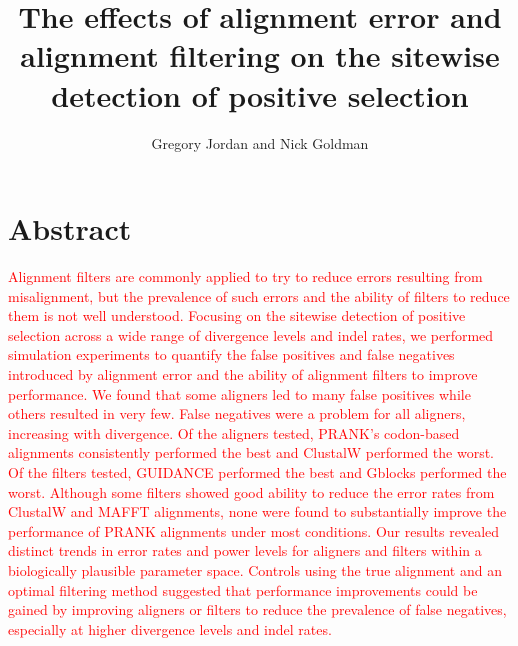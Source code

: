 \documentclass{article}
\begin{document}
\renewcommand\refname{Literature Cited}

\newcommand{\mtwo}{PAML M2a\xspace}
\newcommand{\meight}{PAML M8\xspace}
\newcommand{\pranka}{PRANK$_{\textrm{AA}}$\xspace}
\newcommand{\prankc}{PRANK$_{\textrm{C}}$\xspace}
\newcommand{\omg}{\bm{\omega}\xspace}
\newcommand{\tpr}{TPR$_{1\%}$\xspace}
\newcommand{\sw}{sitewise\xspace}
\newcommand{\Sw}{Sitewise\xspace}
\newcommand{\Dr}{{\emph{Drosophila}}\xspace}

\title{The effects of alignment error and alignment filtering on the \sw detection of positive selection}
\author{{Gregory Jordan and Nick Goldman}}
\maketitle

\section*{Abstract}
\textcolor{red}{
Alignment filters are commonly applied to try to reduce errors
resulting from misalignment, but the prevalence of such errors and the
ability of filters to reduce them is not well understood.
% 
Focusing on the sitewise detection of positive selection across a wide
range of divergence levels and indel rates, we performed simulation
experiments to quantify the false positives and false negatives
introduced by alignment error and the ability of alignment filters to
improve performance.
%
We found that some aligners led to many false positives while others
resulted in very few.  False negatives were a problem for all
aligners, increasing with divergence. Of the aligners tested, PRANK's
codon-based alignments consistently performed the best and ClustalW
performed the worst.
%
Of the filters tested, GUIDANCE performed the best and Gblocks
performed the worst. Although some filters showed good ability to
reduce the error rates from ClustalW and MAFFT alignments, none were
found to substantially improve the performance of PRANK alignments
under most \textcolor{red}{conditions}.
% 
Our results revealed distinct trends in error rates and power levels
for aligners and filters within a biologically plausible parameter
space. Controls using the true alignment and an optimal filtering
method suggested that performance improvements could be gained by
improving aligners or filters to reduce the prevalence of false
negatives, especially at higher divergence levels and indel rates.
}
\end{document}
